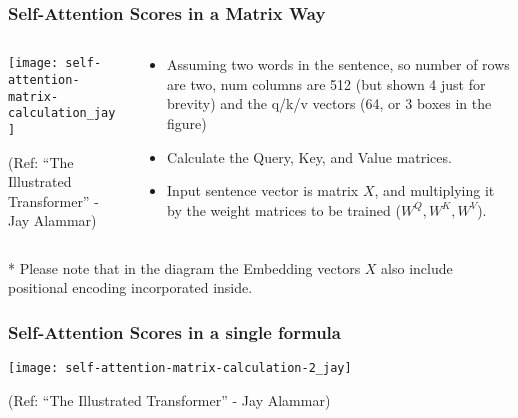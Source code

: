 \begin{frame}[fragile]\frametitle{Self-Attention Scores in a Matrix Way}

\begin{columns}
    \begin{column}[T]{0.5\linewidth}
\begin{center}
\texttt{[image: self-attention-matrix-calculation\_jay]}


{\tiny (Ref: ``The Illustrated Transformer'' - Jay Alammar)}
\end{center}		

		\end{column}
    \begin{column}[T]{0.5\linewidth}

\begin{itemize}
\item Assuming two words in the sentence, so number of rows are two, num columns are 512 (but shown 4 just for brevity) and the q/k/v vectors (64, or 3 boxes in the figure)
\item  Calculate the Query, Key, and Value matrices. 
\item Input sentence vector is matrix $X$, and multiplying it by the weight matrices to be trained ($W^Q, W^K, W^V$).
\end{itemize}
    \end{column}
  \end{columns}

* Please note that in the diagram the Embedding vectors $X$ also include positional encoding incorporated inside.
\end{frame}

\begin{frame}[fragile]\frametitle{Self-Attention Scores in a single formula}


\begin{center}
\texttt{[image: self-attention-matrix-calculation-2\_jay]}


{\tiny (Ref: ``The Illustrated Transformer'' - Jay Alammar)}
\end{center}		

\end{frame}






